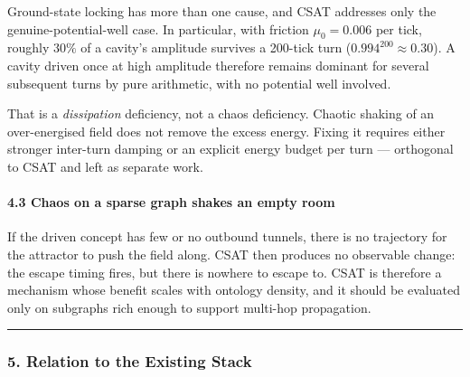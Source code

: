 \documentclass[
  11pt,
  a4paper,
]{article}
\begin{document}
Ground-state locking has more than one cause, and CSAT addresses only
the genuine-potential-well case. In particular, with friction
\(\mu_0 = 0.006\) per tick, roughly \(30\%\) of a cavity's amplitude
survives a 200-tick turn (\(0.994^{200} \approx 0.30\)). A cavity driven
once at high amplitude therefore remains dominant for several subsequent
turns by pure arithmetic, with no potential well involved.

That is a \emph{dissipation} deficiency, not a chaos deficiency. Chaotic
shaking of an over-energised field does not remove the excess energy.
Fixing it requires either stronger inter-turn damping or an explicit
energy budget per turn --- orthogonal to CSAT and left as separate work.

\paragraph{4.3 Chaos on a sparse graph shakes an empty
room}\label{chaos-on-a-sparse-graph-shakes-an-empty-room}

If the driven concept has few or no outbound tunnels, there is no
trajectory for the attractor to push the field along. CSAT then produces
no observable change: the escape timing fires, but there is nowhere to
escape to. CSAT is therefore a mechanism whose benefit scales with
ontology density, and it should be evaluated only on subgraphs rich
enough to support multi-hop propagation.

\begin{center}\rule{0.5\linewidth}{0.5pt}\end{center}

\subsubsection{5. Relation to the Existing
Stack}\label{relation-to-the-existing-stack}
\end{document}
